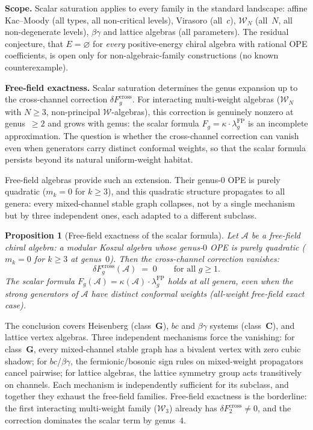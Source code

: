 \documentclass[11pt]{report}
\newtheorem{proposition}[theorem]{Proposition}
\theoremstyle{definition}
\theoremstyle{remark}
\providecommand{\cA}{\mathcal{A}}
\providecommand{\cW}{\mathcal{W}}
\numberwithin{equation}{section}
\begin{document}
\medskip
\noindent\textbf{Scope.}
Scalar saturation applies to every family in the standard landscape:
affine Kac--Moody (all types, all non-critical levels),
Virasoro (all~$c$), $\mathcal W_N$ (all~$N$, all non-degenerate
levels), $\beta\gamma$ and lattice algebras (all parameters). The
residual conjecture, that $E=\varnothing$ for \emph{every}
positive-energy chiral algebra with rational OPE coefficients, is
open only for non-algebraic-family constructions (no known counterexample).

\medskip
\noindent\textbf{Free-field exactness.}\enspace
Scalar saturation determines the genus expansion up to the
cross-channel correction $\delta F_g^{\mathrm{cross}}$. For interacting
multi-weight algebras ($\cW_N$ with $N \geq 3$, non-principal
$\cW$-algebras), this correction is genuinely nonzero at genus~$\geq 2$
and grows with genus: the scalar formula
$F_g = \kappa\cdot\lambda_g^{\mathrm{FP}}$ is an incomplete
approximation. The question is whether the cross-channel correction can
vanish even when generators carry distinct conformal weights, so that the
scalar formula persists beyond its natural uniform-weight habitat.

Free-field algebras provide such an extension. Their genus-$0$ OPE
is purely quadratic ($m_k = 0$ for $k \geq 3$), and this quadratic
structure propagates to all genera: every mixed-channel stable graph
collapses, not by a single mechanism but by three independent ones,
each adapted to a different subclass.

\begin{proposition}[Free-field exactness of the scalar formula]
\label{prop:svy-free-field-exact}
Let\/ $\cA$ be a free-field chiral algebra: a modular Koszul
algebra whose genus-$0$ OPE is purely quadratic
\textup{(}$m_k = 0$ for $k \geq 3$ at genus~$0$\textup{)}.
Then the cross-channel correction vanishes:
\[
\delta F_g^{\mathrm{cross}}(\cA) \;=\; 0
\qquad\text{for all } g \geq 1.
\]
The scalar formula
$F_g(\cA) = \kappa(\cA)\cdot\lambda_g^{\mathrm{FP}}$ holds at
all genera, even when the strong generators of\/ $\cA$ have
distinct conformal weights
\textup{(}all-weight free-field exact case\textup{)}.
\end{proposition}

\noindent
The conclusion covers Heisenberg (class~$\mathbf{G}$), $bc$ and
$\beta\gamma$ systems (class~$\mathbf{C}$), and lattice vertex
algebras. Three independent mechanisms force the vanishing: for
class~$\mathbf{G}$, every mixed-channel stable graph has a bivalent
vertex with zero cubic shadow; for $bc$/$\beta\gamma$, the
fermionic/bosonic sign rules on mixed-weight propagators cancel
pairwise; for lattice algebras, the lattice symmetry group acts
transitively on channels. Each mechanism is independently
sufficient for its subclass, and together they exhaust the
free-field families. Free-field exactness is the
borderline: the first interacting multi-weight family ($\cW_3$) already
has $\delta F_2^{\mathrm{cross}} \neq 0$, and the correction
dominates the scalar term by genus~$4$.
\end{document}
